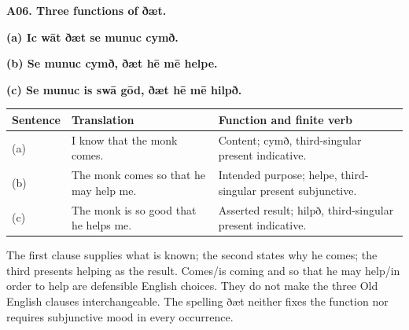 \par\begin{minipage}{\linewidth}\raggedright
\textbf{A06. Three functions of ðæt.}

\textbf{(a) Ic wāt ðæt se munuc cymð.}

\textbf{(b) Se munuc cymð, ðæt hē mē helpe.}

\textbf{(c) Se munuc is swā gōd, ðæt hē mē hilpð.}

\par\begingroup
\fontsize{10.5}{13.2}\selectfont
\setlength{\LTleft}{0pt}\setlength{\LTright}{\fill}
\noindent
\begin{tabular}{@{}>{\raggedright\arraybackslash}p{17.45mm}>{\raggedright\arraybackslash}p{40.39mm}>{\raggedright\arraybackslash}p{60.54mm}@{}}
\toprule
\textbf{Sentence} & \textbf{Translation} & \textbf{Function and finite verb} \\
\midrule
(a) & I know that the monk comes. & Content; cymð, third-singular present indicative. \\
(b) & The monk comes so that he may help me. & Intended purpose; helpe, third-singular present subjunctive. \\
(c) & The monk is so good that he helps me. & Asserted result; hilpð, third-singular present indicative. \\
\bottomrule
\end{tabular}
\par\endgroup

The first clause supplies what is known; the second states why he comes; the third presents helping as the result. Comes/\allowbreak{}is coming and so that he may help/\allowbreak{}in order to help are defensible English choices. They do not make the three Old English clauses interchangeable. The spelling ðæt neither fixes the function nor requires subjunctive mood in every occurrence.

\end{minipage}\par\addvspace{4pt}

